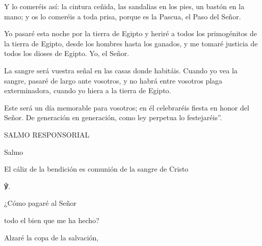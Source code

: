 			\begin{readtalk}Y lo comeréis así: la cintura ceñida, las sandalias en los pies, un bastón en la mano; y os lo comeréis a toda prisa, porque es la Pascua, el Paso del Señor. \end{readtalk}
			
			\begin{readtalk}Yo pasaré esta noche por la tierra de Egipto y heriré a todos los primogénitos de la tierra de Egipto, desde los hombres hasta los ganados, y me tomaré justicia de todos los dioses de Egipto. Yo, el Señor. \end{readtalk}
			
			\begin{readtalk}La sangre será vuestra señal en las casas donde habitáis. Cuando yo vea la sangre, pasaré de largo ante vosotros, y no habrá entre vosotros plaga exterminadora, cuando yo hiera a la tierra de Egipto. \end{readtalk}
			
			\begin{readtalk}Este será un día memorable para vosotros; en él celebraréis fiesta en honor del Señor. De generación en generación, como ley perpetua lo festejaréis”.\end{readtalk}
			
			\begin{readtitle}SALMO RESPONSORIAL\end{readtitle}
			
			\begin{readbook}Salmo \end{readbook}
			
			\begin{readtheme}El cáliz de la bendición es comunión de la sangre de Cristo\end{readtheme}
			
			\begin{readps}\begin{readred}℣.\end{readred} ¿Cómo pagaré al Señor \end{readps}
			
			\begin{readtabbed}todo el bien que me ha hecho? \end{readtabbed}
			
			\begin{readtabbed}Alzaré la copa de la salvación, \end{readtabbed}
			
